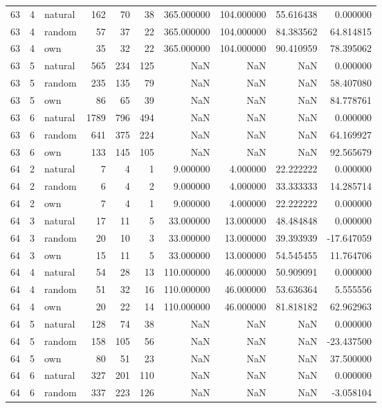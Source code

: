 \begin{table}[htbp]
\begin{tabular}{rrlrrrrrrr}
63 & 4 & natural & 162 & 70 & 38 & 365.000000 & 104.000000 & 55.616438 & 0.000000 \\
63 & 4 & random & 57 & 37 & 22 & 365.000000 & 104.000000 & 84.383562 & 64.814815 \\
63 & 4 & own & 35 & 32 & 22 & 365.000000 & 104.000000 & 90.410959 & 78.395062 \\
63 & 5 & natural & 565 & 234 & 125 & NaN & NaN & NaN & 0.000000 \\
63 & 5 & random & 235 & 135 & 79 & NaN & NaN & NaN & 58.407080 \\
63 & 5 & own & 86 & 65 & 39 & NaN & NaN & NaN & 84.778761 \\
63 & 6 & natural & 1789 & 796 & 494 & NaN & NaN & NaN & 0.000000 \\
63 & 6 & random & 641 & 375 & 224 & NaN & NaN & NaN & 64.169927 \\
63 & 6 & own & 133 & 145 & 105 & NaN & NaN & NaN & 92.565679 \\
64 & 2 & natural & 7 & 4 & 1 & 9.000000 & 4.000000 & 22.222222 & 0.000000 \\
64 & 2 & random & 6 & 4 & 2 & 9.000000 & 4.000000 & 33.333333 & 14.285714 \\
64 & 2 & own & 7 & 4 & 1 & 9.000000 & 4.000000 & 22.222222 & 0.000000 \\
64 & 3 & natural & 17 & 11 & 5 & 33.000000 & 13.000000 & 48.484848 & 0.000000 \\
64 & 3 & random & 20 & 10 & 3 & 33.000000 & 13.000000 & 39.393939 & -17.647059 \\
64 & 3 & own & 15 & 11 & 5 & 33.000000 & 13.000000 & 54.545455 & 11.764706 \\
64 & 4 & natural & 54 & 28 & 13 & 110.000000 & 46.000000 & 50.909091 & 0.000000 \\
64 & 4 & random & 51 & 32 & 16 & 110.000000 & 46.000000 & 53.636364 & 5.555556 \\
64 & 4 & own & 20 & 22 & 14 & 110.000000 & 46.000000 & 81.818182 & 62.962963 \\
64 & 5 & natural & 128 & 74 & 38 & NaN & NaN & NaN & 0.000000 \\
64 & 5 & random & 158 & 105 & 56 & NaN & NaN & NaN & -23.437500 \\
64 & 5 & own & 80 & 51 & 23 & NaN & NaN & NaN & 37.500000 \\
64 & 6 & natural & 327 & 201 & 110 & NaN & NaN & NaN & 0.000000 \\
64 & 6 & random & 337 & 223 & 126 & NaN & NaN & NaN & -3.058104 \\

\end{tabular}
\end{table}
